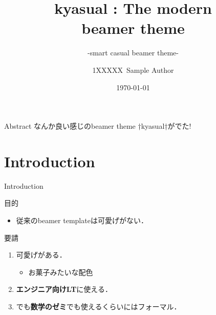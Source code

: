 \documentclass[aspectratio=1610,14pt]{beamer}
\title{%
    kyasual : The modern\\ beamer theme
}
\subtitle{
    -smart casual beamer theme-
}
\author{%
    1XXXXX\ Sample Author
}
\institute[Sample Univ.]{%
    Sample Univ. 
}
\date{%
    \today
}
\begin{document}
%
%
\begin{frame}
\maketitle 
\end{frame}

\begin{frame}[fragile]{Abstract}
        なんか良い感じのbeamer theme †\alert{kyasual}†がでた!
\end{frame}

\section{Introduction}

\begin{frame}
    \tableofcontents[currentsection]
\end{frame}

\begin{frame}{Introduction}
    \begin{textblock}{目的}
        \begin{itemize}
        \item{従来のbeamer templateは可愛げがない．}
        \end{itemize}
    \end{textblock}
    \begin{textblock}{要請}
        \begin{enumerate}
            \item{\alert{可愛げがある．}}
                \begin{itemize}
                    \item{お菓子みたいな配色}
                \end{itemize}
            \item{\textbf{エンジニア向けLT}に使える．}
            \item{でも\textbf{数学のゼミ}でも使えるくらいには\alert{フォーマル}．}
                \begin{itemize}
                \end{itemize}
        \end{enumerate}
    \end{textblock}
\end{frame}
\end{document}
